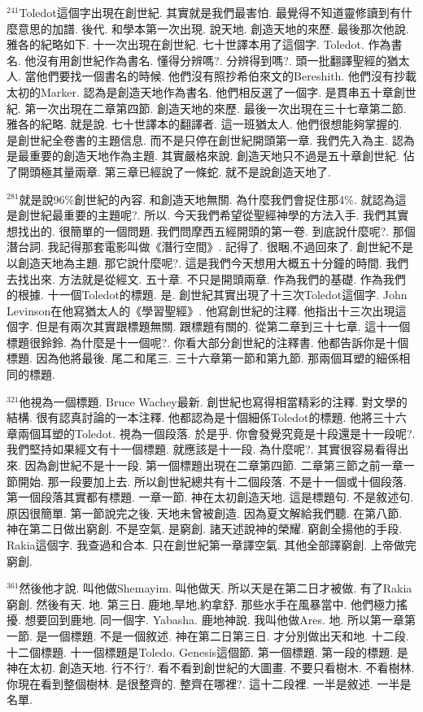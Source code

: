 \documentclass{book}
\begin{document}
$^{241}$Toledot這個字出現在創世紀.
其實就是我們最害怕.
最覺得不知道靈修讀到有什麼意思的加譜.
後代.
和學本第一次出現.
說天地.
創造天地的來歷.
最後那次他說.
雅各的紀略如下.
十一次出現在創世紀.
七十世譯本用了這個字.
Toledot.
作為書名.
他沒有用創世紀作為書名.
懂得分辨嗎?.
分辨得到嗎?.
頭一批翻譯聖經的猶太人.
當他們要找一個書名的時候.
他們沒有照抄希伯來文的Bereshith.
他們沒有抄載太初的Marker.
認為是創造天地作為書名.
他們相反選了一個字.
是貫串五十章創世紀.
第一次出現在二章第四節.
創造天地的來歷.
最後一次出現在三十七章第二節.
雅各的紀略.
就是說.
七十世譯本的翻譯者.
這一班猶太人.
他們很想能夠掌握的.
是創世紀全卷書的主題信息.
而不是只停在創世紀開頭第一章.
我們先入為主.
認為是最重要的創造天地作為主題.
其實嚴格來說.
創造天地只不過是五十章創世紀.
佔了開頭極其量兩章.
第三章已經說了一條蛇.
就不是說創造天地了.

$^{281}$就是說96\%創世紀的內容.
和創造天地無關.
為什麼我們會捉住那4\%.
就認為這是創世紀最重要的主題呢?.
所以.
今天我們希望從聖經神學的方法入手.
我們其實想找出的.
很簡單的一個問題.
我們問摩西五經開頭的第一卷.
到底說什麼呢?.
那個潛台詞.
我記得那套電影叫做《潛行空間》.
記得了.
很睏,不過回來了.
創世紀不是以創造天地為主題.
那它說什麼呢?.
這是我們今天想用大概五十分鐘的時間.
我們去找出來.
方法就是從經文.
五十章.
不只是開頭兩章.
作為我們的基礎.
作為我們的根據.
十一個Toledot的標題.
是.
創世紀其實出現了十三次Toledot這個字.
John Levinson在他寫猶太人的《學習聖經》.
他寫創世紀的注釋.
他指出十三次出現這個字.
但是有兩次其實跟標題無關.
跟標題有關的.
從第二章到三十七章.
這十一個標題很鈴鈴.
為什麼是十一個呢?.
你看大部分創世紀的注釋書.
他都告訴你是十個標題.
因為他將最後.
尾二和尾三.
三十六章第一節和第九節.
那兩個耳塑的細係相同的標題.

$^{321}$他視為一個標題.
Bruce Wachey最新.
創世紀也寫得相當精彩的注釋.
對文學的結構.
很有認真討論的一本注釋.
他都認為是十個細係Toledot的標題.
他將三十六章兩個耳塑的Toledot.
視為一個段落.
於是乎.
你會發覺究竟是十段還是十一段呢?.
我們堅持如果經文有十一個標題.
就應該是十一段.
為什麼呢?.
其實很容易看得出來.
因為創世紀不是十一段.
第一個標題出現在二章第四節.
二章第三節之前一章一節開始.
那一段要加上去.
所以創世紀總共有十二個段落.
不是十一個或十個段落.
第一個段落其實都有標題.
一章一節.
神在太初創造天地.
這是標題句.
不是敘述句.
原因很簡單.
第一節說完之後.
天地未曾被創造.
因為夏文解給我們聽.
在第八節.
神在第二日做出窮創.
不是空氣.
是窮創.
諸天述說神的榮耀.
窮創全揚他的手段.
Rakia這個字.
我查過和合本.
只在創世紀第一章譯空氣.
其他全部譯窮創.
上帝做完窮創.

$^{361}$然後他才說.
叫他做Shemayim.
叫他做天.
所以天是在第二日才被做.
有了Rakia窮創.
然後有天.
地.
第三日.
鹿地,旱地,約拿舒.
那些水手在風暴當中.
他們極力搖擾.
想要回到鹿地.
同一個字.
Yabasha.
鹿地神說.
我叫他做Ares.
地.
所以第一章第一節.
是一個標題.
不是一個敘述.
神在第二日第三日.
才分別做出天和地.
十二段.
十二個標題.
十一個標題是Toledo.
Genesis這個節.
第一個標題.
第一段的標題.
是神在太初.
創造天地.
行不行?.
看不看到創世紀的大圖畫.
不要只看樹木.
不看樹林.
你現在看到整個樹林.
是很整齊的.
整齊在哪裡?.
這十二段裡.
一半是敘述.
一半是名單.
\end{document}
